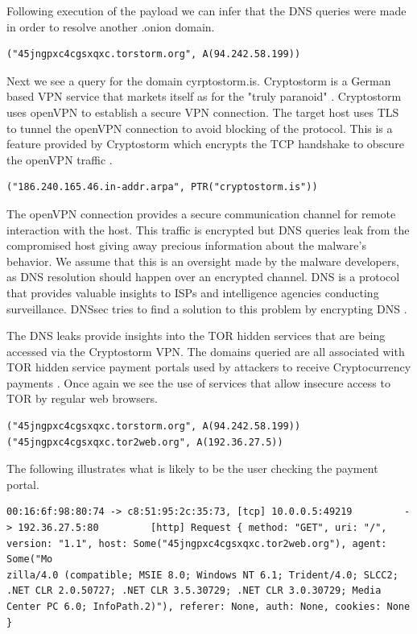 \documentclass[11pt]{diazessay} %
\begin{document}
Following execution of the payload we can infer that the DNS queries were made in order to resolve another .onion domain.

\begin{lstlisting}[language=html]
("45jngpxc4cgsxqxc.torstorm.org", A(94.242.58.199))
\end{lstlisting}

Next we see a query for the domain cyrptostorm.is. Cryptostorm is a German based VPN service that markets itself as for the "truly paranoid" \cite{cryptostorm}. Cryptostorm uses openVPN to establish a secure VPN connection. The target host uses TLS to tunnel the openVPN connection to avoid blocking of the protocol. This is a feature provided by Cryptostorm which encrypts the TCP handshake to obscure the openVPN traffic \cite{tls}. 

\begin{lstlisting}
("186.240.165.46.in-addr.arpa", PTR("cryptostorm.is"))
\end{lstlisting}

The openVPN connection provides a secure communication channel for remote interaction with the host. This traffic is encrypted but DNS queries leak from the compromised host giving away precious information about the malware's behavior. We assume that this is an oversight made by the malware developers, as DNS resolution should happen over an encrypted channel.  DNS is a protocol that provides valuable insights to ISPs and intelligence agencies conducting surveillance. DNSsec tries to find a solution to this problem by encrypting DNS \cite{dnssec}. 

The DNS leaks provide insights into the TOR hidden services that are being accessed via the Cryptostorm VPN. The domains queried are all associated with TOR hidden service payment portals used by attackers to receive Cryptocurrency payments \cite{hybrid}. Once again we see the use of services that allow insecure access to TOR by regular web browsers. 

\begin{lstlisting}
("45jngpxc4cgsxqxc.torstorm.org", A(94.242.58.199)) 
("45jngpxc4cgsxqxc.tor2web.org", A(192.36.27.5))
\end{lstlisting}

The following illustrates what is likely to be the user checking the payment portal.
\begin{lstlisting}
00:16:6f:98:80:74 -> c8:51:95:2c:35:73, [tcp] 10.0.0.5:49219         -> 192.36.27.5:80         [http] Request { method: "GET", uri: "/", version: "1.1", host: Some("45jngpxc4cgsxqxc.tor2web.org"), agent: Some("Mo
zilla/4.0 (compatible; MSIE 8.0; Windows NT 6.1; Trident/4.0; SLCC2; .NET CLR 2.0.50727; .NET CLR 3.5.30729; .NET CLR 3.0.30729; Media Center PC 6.0; InfoPath.2)"), referer: None, auth: None, cookies: None }
\end{lstlisting}
\end{document}
